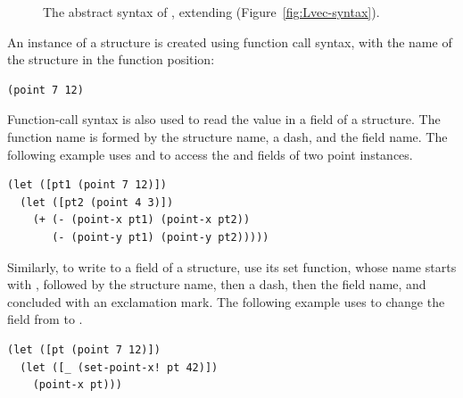 \documentclass[7x10,nocrop]{TimesAPriori_MIT}%
\newcommand{\gray}[1]{{\color{gray} #1}}
\begin{document}
{\begin{figure}[tbp]
\centering
\fbox{
\begin{minipage}{0.96\textwidth}
\[
\begin{array}{l}
  \gray{\LintASTRacket{}} \\ \hline
  \gray{\LvarASTRacket{}} \\ \hline
  \gray{\LifASTRacket{}} \\ \hline
  \gray{\LwhileASTRacket} \\ \hline
  \gray{\LtupASTRacket} \\  \hline
  \LstructASTRacket \\
\begin{array}{lcl}
  \LangStruct{} &::=& \PROGRAMDEFSEXP{\code{'()}}{\LP\Def\ldots\RP)}{\Exp}
\end{array}
\end{array}
\]
\end{minipage}
}
\caption{The abstract syntax of \LangStruct{}, extending \LangVec{}
  (Figure~\ref{fig:Lvec-syntax}).}
\label{fig:Lstruct-syntax}
\end{figure}

An instance of a structure is created using function call syntax, with
the name of the structure in the function position:
\begin{lstlisting}
(point 7 12)
\end{lstlisting}
Function-call syntax is also used to read the value in a field of a
structure. The function name is formed by the structure name, a dash,
and the field name. The following example uses  and
 to access the  and  fields of two point
instances.
\begin{center}
\begin{lstlisting}
(let ([pt1 (point 7 12)])
  (let ([pt2 (point 4 3)])
    (+ (- (point-x pt1) (point-x pt2))
       (- (point-y pt1) (point-y pt2)))))
\end{lstlisting}
\end{center}
Similarly, to write to a field of a structure, use its set function,
whose name starts with , followed by the structure name,
then a dash, then the field name, and concluded with an exclamation
mark. The following example uses  to change the
 field from  to .
\begin{center}
  \begin{lstlisting}
(let ([pt (point 7 12)])
  (let ([_ (set-point-x! pt 42)])
    (point-x pt)))
\end{lstlisting}
\end{center}

}
\end{document}
